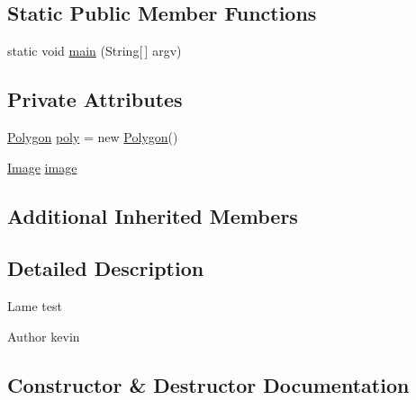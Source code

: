 \subsection*{Static Public Member Functions}
\begin{DoxyCompactItemize}
\item 
static void \mbox{\hyperlink{classorg_1_1newdawn_1_1slick_1_1tests_1_1_lame_test_a6d201f9fcd6ffc8dfa6bc2a49913dd2d}{main}} (String\mbox{[}$\,$\mbox{]} argv)
\end{DoxyCompactItemize}
\subsection*{Private Attributes}
\begin{DoxyCompactItemize}
\item 
\mbox{\hyperlink{classorg_1_1newdawn_1_1slick_1_1geom_1_1_polygon}{Polygon}} \mbox{\hyperlink{classorg_1_1newdawn_1_1slick_1_1tests_1_1_lame_test_a5d3e81e1db5ba7234621635d3665753d}{poly}} = new \mbox{\hyperlink{classorg_1_1newdawn_1_1slick_1_1geom_1_1_polygon}{Polygon}}()
\item 
\mbox{\hyperlink{classorg_1_1newdawn_1_1slick_1_1_image}{Image}} \mbox{\hyperlink{classorg_1_1newdawn_1_1slick_1_1tests_1_1_lame_test_a00beddefcc3b233938def19fc8d969fb}{image}}
\end{DoxyCompactItemize}
\subsection*{Additional Inherited Members}


\subsection{Detailed Description}
Lame test

\begin{DoxyAuthor}{Author}
kevin 
\end{DoxyAuthor}


\subsection{Constructor \& Destructor Documentation}
\mbox{\label{classorg_1_1newdawn_1_1slick_1_1tests_1_1_lame_test_a8a3bf60ab7c2229e1e5f062f619e8706}} 
